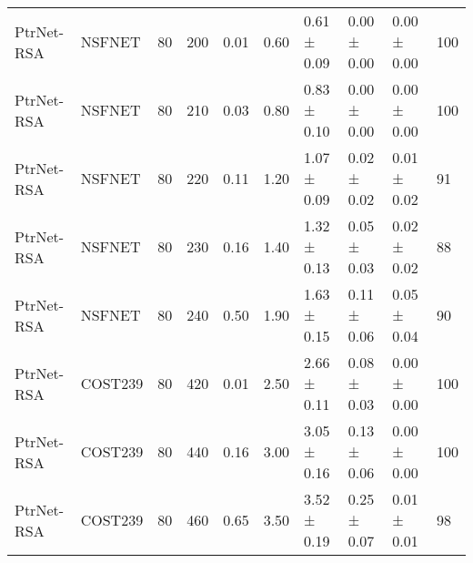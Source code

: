 \begin{longtable}[!htbp]{llll|lllll|l}
PtrNet-RSA           & NSFNET            & 80                   & 200                                                               & 0.01 & \multicolumn{1}{l|}{0.60}     & 0.61 ± 0.09 & 0.00 ± 0.00      & 0.00 ± 0.00                  & 100                                                                                    \\
PtrNet-RSA           & NSFNET            & 80                   & 210                                                               & 0.03 & \multicolumn{1}{l|}{0.80}     & 0.83 ± 0.10 & 0.00 ± 0.00      & 0.00 ± 0.00                  & 100                                                                                    \\
PtrNet-RSA           & NSFNET            & 80                   & 220                                                               & 0.11 & \multicolumn{1}{l|}{1.20}     & 1.07 ± 0.09 & 0.02 ± 0.02      & 0.01 ± 0.02                  & 91                                                                                    \\
PtrNet-RSA           & NSFNET            & 80                   & 230                                                               & 0.16 & \multicolumn{1}{l|}{1.40}     & 1.32 ± 0.13 & 0.05 ± 0.03      & 0.02 ± 0.02                  & 88                                                                                    \\
PtrNet-RSA           & NSFNET            & 80                   & 240                                                               & 0.50  & \multicolumn{1}{l|}{1.90}     & 1.63 ± 0.15 & 0.11 ± 0.06      & 0.05 ± 0.04                  & 90                                                                                    \\
PtrNet-RSA           & COST239           & 80                   & 420                                                               & 0.01 & \multicolumn{1}{l|}{2.50}     & 2.66 ± 0.11  & 0.08 ± 0.03      & 0.00 ± 0.00                  & 100                                                                                    \\
PtrNet-RSA           & COST239           & 80                   & 440                                                               & 0.16 & \multicolumn{1}{l|}{3.00}       & 3.05 ± 0.16 & 0.13 ± 0.06      & 0.00 ± 0.00                  & 100                                                                                    \\
PtrNet-RSA           & COST239           & 80                   & 460                                                               & 0.65 & \multicolumn{1}{l|}{3.50}     & 3.52 ± 0.19 & 0.25 ± 0.07      & 0.01 ± 0.01                  & 98                                                                                    \\

\end{longtable}
